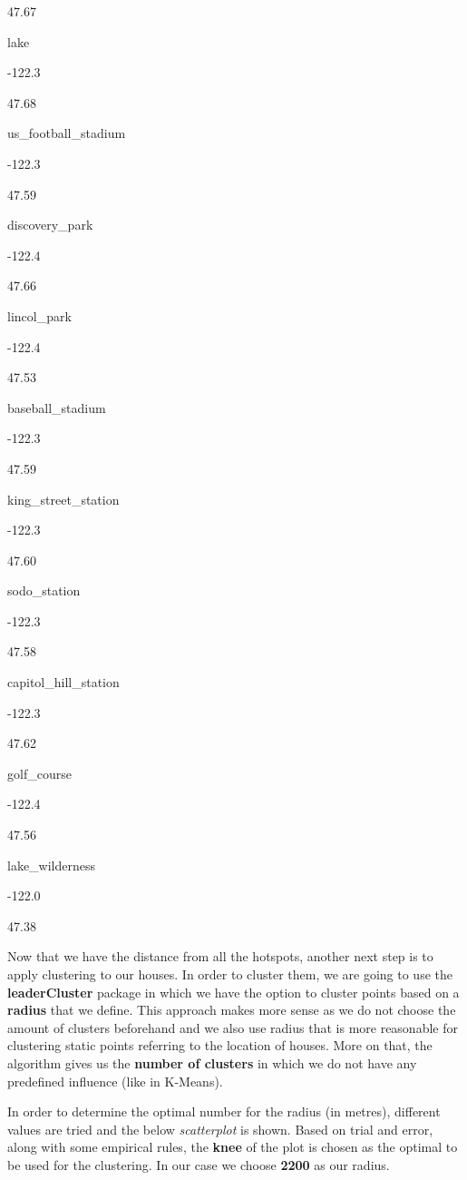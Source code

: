 \documentclass[]{article}
\begin{document}
47.67

lake

-122.3

47.68

us\_football\_stadium

-122.3

47.59

discovery\_park

-122.4

47.66

lincol\_park

-122.4

47.53

baseball\_stadium

-122.3

47.59

king\_street\_station

-122.3

47.60

sodo\_station

-122.3

47.58

capitol\_hill\_station

-122.3

47.62

golf\_course

-122.4

47.56

lake\_wilderness

-122.0

47.38

Now that we have the distance from all the hotspots, another next step
is to apply clustering to our houses. In order to cluster them, we are
going to use the \textbf{leaderCluster} package in which we have the
option to cluster points based on a \textbf{radius} that we define. This
approach makes more sense as we do not choose the amount of clusters
beforehand and we also use radius that is more reasonable for clustering
static points referring to the location of houses. More on that, the
algorithm gives us the \textbf{number of clusters} in which we do not
have any predefined influence (like in K-Means).

In order to determine the optimal number for the radius (in metres),
different values are tried and the below \emph{scatterplot} is shown.
Based on trial and error, along with some empirical rules, the
\textbf{knee} of the plot is chosen as the optimal to be used for the
clustering. In our case we choose \textbf{2200} as our radius.
\end{document}
